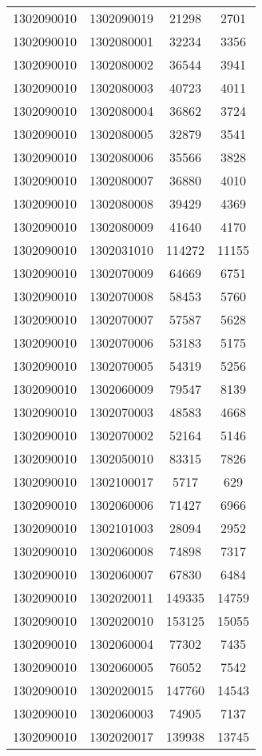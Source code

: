 \begin{longtable}[h]{llcc}
		1302090010 & 1302090019 & 21298 & 2701\\
		1302090010 & 1302080001 & 32234 & 3356\\
		1302090010 & 1302080002 & 36544 & 3941\\
		1302090010 & 1302080003 & 40723 & 4011\\
		1302090010 & 1302080004 & 36862 & 3724\\
		1302090010 & 1302080005 & 32879 & 3541\\
		1302090010 & 1302080006 & 35566 & 3828\\
		1302090010 & 1302080007 & 36880 & 4010\\
		1302090010 & 1302080008 & 39429 & 4369\\
		1302090010 & 1302080009 & 41640 & 4170\\
		1302090010 & 1302031010 & 114272 & 11155\\
		1302090010 & 1302070009 & 64669 & 6751\\
		1302090010 & 1302070008 & 58453 & 5760\\
		1302090010 & 1302070007 & 57587 & 5628\\
		1302090010 & 1302070006 & 53183 & 5175\\
		1302090010 & 1302070005 & 54319 & 5256\\
		1302090010 & 1302060009 & 79547 & 8139\\
		1302090010 & 1302070003 & 48583 & 4668\\
		1302090010 & 1302070002 & 52164 & 5146\\
		1302090010 & 1302050010 & 83315 & 7826\\
		1302090010 & 1302100017 & 5717 & 629\\
		1302090010 & 1302060006 & 71427 & 6966\\
		1302090010 & 1302101003 & 28094 & 2952\\
		1302090010 & 1302060008 & 74898 & 7317\\
		1302090010 & 1302060007 & 67830 & 6484\\
		1302090010 & 1302020011 & 149335 & 14759\\
		1302090010 & 1302020010 & 153125 & 15055\\
		1302090010 & 1302060004 & 77302 & 7435\\
		1302090010 & 1302060005 & 76052 & 7542\\
		1302090010 & 1302020015 & 147760 & 14543\\
		1302090010 & 1302060003 & 74905 & 7137\\
		1302090010 & 1302020017 & 139938 & 13745\\

\end{longtable}
